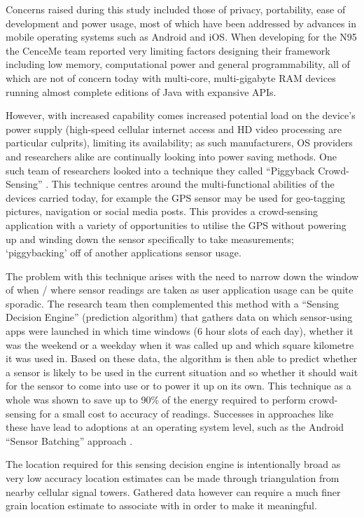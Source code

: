 \documentclass{UoYCSproject}
\begin{document}
            Concerns raised during this study included those of privacy, portability, ease of development and power usage, most of which have been addressed by advances in mobile operating systems such as Android and iOS. When developing for the N95 the CenceMe team reported very limiting factors designing their framework including low memory, computational power and general programmability, all of which are not of concern today with multi-core, multi-gigabyte RAM devices running almost complete editions of Java with expansive APIs.
            
            However, with increased capability comes increased potential load on the device's power supply (high-speed cellular internet access and HD video processing are particular culprits), limiting its availability; as such manufacturers, OS providers and researchers alike are continually looking into power saving methods. One such team of researchers looked into a technique they called ``Piggyback Crowd-Sensing'' \citep{lane2013piggyback}. This technique centres around the multi-functional abilities of the devices carried today, for example the GPS sensor may be used for geo-tagging pictures, navigation or social media posts. This provides a crowd-sensing application with a variety of opportunities to utilise the GPS without powering up and winding down the sensor specifically to take measurements; `piggybacking' off of another applications sensor usage. 
            
            The problem with this technique arises with the need to narrow down the window of when / where sensor readings are taken as user application usage can be quite sporadic. The research team then complemented this method with a ``Sensing Decision Engine'' (prediction algorithm) that gathers data on which sensor-using apps were launched in which time windows (6 hour slots of each day), whether it was the weekend or a weekday when it was called up and which square kilometre it was used in. Based on these data, the algorithm is then able to predict whether a sensor is likely to be used in the current situation and so whether it should wait for the sensor to come into use or to power it up on its own. This technique as a whole was shown to save up to 90\% of the energy required to perform crowd-sensing for a small cost to accuracy of readings. Successes in approaches like these have lead to adoptions at an operating system level, such as the Android ``Sensor Batching'' approach \citep{AndroidSenseBatch}.
            
            The location required for this sensing decision engine is intentionally broad as very low accuracy location estimates can be made through triangulation from nearby cellular signal towers. Gathered data however can require a much finer grain location estimate to associate with in order to make it meaningful.
                
\end{document}
